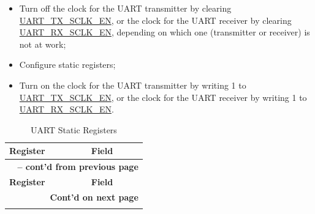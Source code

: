 \documentclass[main\_\_EN.tex]{subfiles}
\begin{document}
\begin{itemize}
    \item Turn off the clock for the UART transmitter by clearing \hyperref[fielddesc:UARTTXSCLKEN]{UART\_TX\_SCLK\_EN}, or the clock for the UART receiver by clearing \hyperref[fielddesc:UARTRXSCLKEN]{UART\_RX\_SCLK\_EN}, depending on which one (transmitter or receiver) is not at work;
    \item Configure static registers;
    \item Turn on the clock for the UART transmitter by writing 1 to \hyperref[fielddesc:UARTTXSCLKEN]{UART\_TX\_SCLK\_EN}, or the clock for the UART receiver by writing 1 to \hyperref[fielddesc:UARTRXSCLKEN]{UART\_RX\_SCLK\_EN}.
\end{itemize}

\begin{longtable}[c]{|p{6cm}|p{6cm}|}
\caption{UART Static Registers}
\label{tab:uart-static-reg} \\
    \hline
    \rowcolor{lightgray}
    \textbf{Register} & \textbf{Field} \\\hline
    \endfirsthead

    \multicolumn{2}{c}{\bfseries \tablename\ \thetable{} -- cont'd from previous page}\\\hline
    \rowcolor{lightgray}
    \textbf{Register} & \textbf{Field} \\\hline
    \endhead

    \multicolumn{2}{r}{\textbf{Cont'd on next page}} \\
    \endfoot
    \endlastfoot


\end{longtable}
\end{document}
